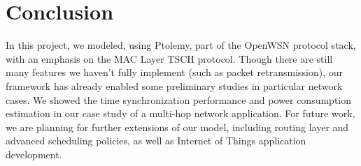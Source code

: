 
\section{Conclusion}
\label{sec:conclusion}

In this project, we modeled, using Ptolemy, part of the OpenWSN protocol stack, with an emphasis on the MAC Layer TSCH protocol. Though there are still many features we haven't fully implement (such as packet retransmission), our framework has already enabled some preliminary studies in particular network cases. We showed the time synchronization performance and power consumption estimation in our case study of a multi-hop network application. For future work, we are planning for further extensions of our model, including routing layer and advanced scheduling policies, as well as Internet of Things application development.

